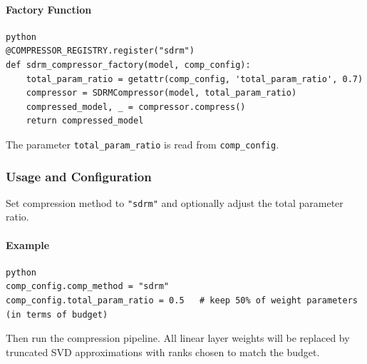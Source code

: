 \paragraph{Factory Function}

\vspace{0.5em}
\begin{mdframed}[backgroundcolor=codebg, linecolor=codeframe, linewidth=1pt, roundcorner=4pt, innerleftmargin=2pt, innerrightmargin=5pt, innertopmargin=5pt, innerbottommargin=5pt]
\begin{lstlisting}
python
@COMPRESSOR_REGISTRY.register("sdrm")
def sdrm_compressor_factory(model, comp_config):
    total_param_ratio = getattr(comp_config, 'total_param_ratio', 0.7)
    compressor = SDRMCompressor(model, total_param_ratio)
    compressed_model, _ = compressor.compress()
    return compressed_model
\end{lstlisting}
\end{mdframed}
\vspace{0.5em}

The parameter \texttt{total\_param\_ratio} is read from \texttt{comp\_config}.


\subsubsection*{Usage and Configuration}

Set compression method to \texttt{"sdrm"} and optionally adjust the total parameter ratio.

\paragraph{Example}

\vspace{0.5em}
\begin{mdframed}[backgroundcolor=codebg, linecolor=codeframe, linewidth=1pt, roundcorner=4pt, innerleftmargin=2pt, innerrightmargin=5pt, innertopmargin=5pt, innerbottommargin=5pt]
\begin{lstlisting}
python
comp_config.comp_method = "sdrm"
comp_config.total_param_ratio = 0.5   # keep 50% of weight parameters (in terms of budget)
\end{lstlisting}
\end{mdframed}
\vspace{0.5em}

Then run the compression pipeline. All linear layer weights will be replaced by truncated SVD approximations with ranks chosen to match the budget.

